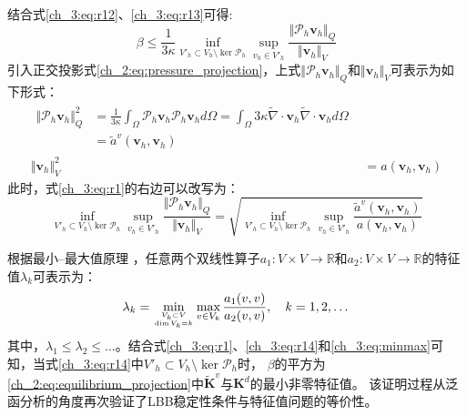 结合式\eqref{ch_3:eq:r12}、\eqref{ch_3:eq:r13}可得:
\begin{equation}\label{ch_3:eq:r1}
    \beta \le \frac{1}{3\kappa}\inf_{V'_h \subset V_h \setminus \ker \mathcal P_h} \sup_{v_h \in V'_h} \frac{\Vert \mathcal P_h \boldsymbol v_h \Vert_Q}{\Vert \boldsymbol v_h \Vert_V}
\end{equation}
引入正交投影式\eqref{ch_2:eq:pressure_projection}，上式$\Vert \mathcal P_h \boldsymbol v_h \Vert_Q$和$\Vert \boldsymbol v_h\Vert_V$可表示为如下形式：
\begin{align}
    \begin{split}
        \Vert \mathcal P_h \boldsymbol v_h \Vert_Q^2 
        &= \frac{1}{3\kappa} \int_\Omega \mathcal P_h \boldsymbol v_h \mathcal P_h \boldsymbol v_h d\Omega
        = \int_\Omega 3\kappa \tilde \nabla \cdot \boldsymbol v_h \tilde \nabla \cdot \boldsymbol v_h d\Omega \\
        &= \tilde a^v (\boldsymbol v_h, \boldsymbol v_h)
    \end{split}\\
    \Vert \boldsymbol v_h \Vert_V^2 
    &= a (\boldsymbol v_h, \boldsymbol v_h)
\end{align}
此时，式\eqref{ch_3:eq:r1}的右边可以改写为：
\begin{equation}\label{ch_3:eq:r14}
    \inf_{V'_h \subset V_h \setminus \ker \mathcal P_h} \sup_{v_h \in V'_h} \frac{\Vert \mathcal P_h \boldsymbol v_h \Vert_Q}{\Vert \boldsymbol v_h \Vert_V}
    = \sqrt{\inf_{V'_h \subset V_h \setminus \ker \mathcal P_h} \sup_{v_h \in V'_h} \frac{\tilde a^v(\boldsymbol v_h, \boldsymbol v_h)}{a(\boldsymbol v_h, \boldsymbol v_h)}}
\end{equation}

根据最小--最大值原理 \cite{babuska1991a}，任意两个双线性算子$a_1:V\times V\rightarrow \mathbb R$和$a_2:V\times V\rightarrow \mathbb R$的特征值$\lambda_k$可表示为：
\begin{equation}\label{ch_3:eq:minmax} 
    \lambda_k = \mathop{\min}_{V_k\subset V \atop \dim V_k= k} \max_{v\in V_k} 
    \frac{a_1(v,v)}{a_2(v,v)}
    ,\quad k=1,2,\dots
\end{equation}
其中，$\lambda_1\le\lambda_2\le\dots$。结合式\eqref{ch_3:eq:r1}、\eqref{ch_3:eq:r14}和\eqref{ch_3:eq:minmax}可知，当式\eqref{ch_3:eq:r14}中$V'_h\subset V_h \setminus \ker \mathcal P_h$时，
$\beta$的平方为\eqref{ch_2:eq:equilibrium_projection}中$\tilde{\boldsymbol K}^v$与$\boldsymbol K^d$的最小非零特征值。
该证明过程从泛函分析的角度再次验证了LBB稳定性条件与特征值问题的等价性。

